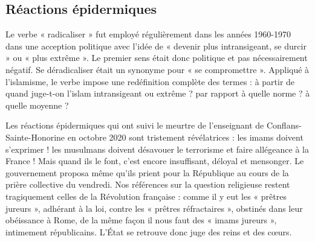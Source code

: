 \subsection{Réactions épidermiques}

Le verbe « radicaliser » fut employé régulièrement dans les années
1960-1970 dans une acception politique avec l'idée de « devenir plus
intransigeant, se durcir » ou « plus extrême ». Le premier sens était
donc politique et pas nécessairement négatif. Se déradicaliser était un
synonyme pour « se compromettre ». Appliqué à l'islamisme, le verbe
impose une redéfinition complète des termes : à partir de quand
juge-t-on l'islam intransigeant ou extrême ? par rapport à quelle norme
? à quelle moyenne ?

Les réactions épidermiques qui ont suivi le meurtre de l'enseignant de
Conflans-Sainte-Honorine en octobre 2020 sont tristement révélatrices :
les imams doivent s'exprimer ! les musulmans doivent désavouer le
terrorisme et faire allégeance à la France ! Mais quand ils le font,
c'est encore insuffisant, déloyal et mensonger. Le gouvernement proposa
même qu'ils prient pour la République au cours de la prière collective
du vendredi. Nos références sur la question religieuse restent
tragiquement celles de la Révolution française : comme il y eut les «
prêtres jureurs », adhérant à la loi, contre les « prêtres réfractaires
», obstinés dans leur obéissance à Rome, de la même façon il nous faut
des « imams jureurs », intimement républicains. L'État se retrouve donc
juge des reins et des cœurs.

